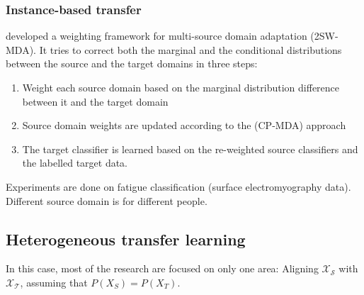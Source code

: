   \subsubsection{Instance-based transfer}
  \citep{chattopadhyay2012multisource} developed a weighting framework for multi-source domain adaptation (2SW-MDA). It tries to correct both the marginal and the conditional distributions between the source and the target domains in three steps:
  \begin{enumerate}
      \item Weight each source domain based on the marginal distribution difference between it and the target domain
      \item Source domain weights are updated according to the (CP-MDA) approach
      \item The target classifier is learned based on the re-weighted source classifiers and the labelled target data.
  \end{enumerate}
  Experiments are done on fatigue classification (surface electromyography data). Different source domain is for different people.


  \subsection{Heterogeneous transfer learning}
  \par In this case, most of the research are focused on only one area: Aligning $\mathcal{X_S}$ with $\mathcal{X_T}$, assuming that $P(X_S) = P(X_T)$.

